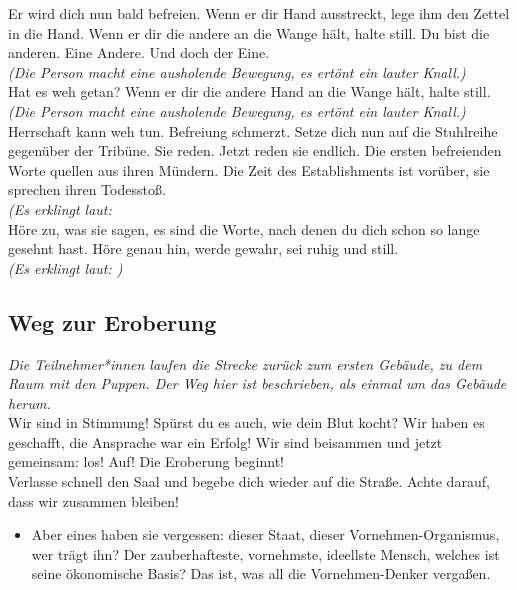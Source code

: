 \documentclass[a4paper, 12pt]{report}
\begin{document}
Er wird dich nun bald befreien. 
Wenn er dir Hand ausstreckt, lege ihm den Zettel in die Hand. 
Wenn er dir die andere an die Wange hält, halte still.
Du bist die anderen. Eine Andere. Und doch der Eine.\\
\emph{(Die Person macht eine ausholende Bewegung, es ertönt ein lauter Knall.)}\\
Hat es weh getan? 
Wenn er dir die andere Hand an die Wange hält, halte still.\\
\emph{(Die Person macht eine ausholende Bewegung, es ertönt ein lauter Knall.)}\\
Herrschaft kann weh tun. 
Befreiung schmerzt.
Setze dich nun auf die Stuhlreihe gegenüber der Tribüne. 
Sie reden.
Jetzt reden sie endlich.
Die ersten befreienden Worte quellen aus ihren Mündern. 
Die Zeit des Establishments ist vorüber, sie sprechen ihren Todesstoß.\\
\emph{(Es erklingt laut: }\\
Höre zu, was sie sagen, es sind die Worte, nach denen du dich schon so lange gesehnt hast. 
Höre genau hin, werde gewahr, sei ruhig und still.\\
\emph{(Es erklingt laut: )}\\



\subsection{Weg zur Eroberung}
\textit{Die Teilnehmer*innen laufen die Strecke zurück zum ersten Gebäude, zu dem Raum mit den Puppen. Der Weg hier ist beschrieben, als einmal um das Gebäude herum.}\\

Wir sind in Stimmung! 
Spürst du es auch, wie dein Blut kocht?
Wir haben es geschafft, die Ansprache war ein Erfolg! 
Wir sind beisammen und jetzt gemeinsam: los! Auf! Die Eroberung beginnt!\\
Verlasse schnell den Saal und begebe dich wieder auf die Straße. 
Achte darauf, dass wir zusammen bleiben!

\begin{itemize}\em
\item[] Aber eines haben sie vergessen:
    dieser Staat, dieser Vornehmen-Organismus, wer trägt ihn? 
    Der zauberhafteste, vornehmste, ideellste Mensch, welches ist seine ökonomische Basis?
    Das ist, was all die Vornehmen-Denker vergaßen. 
\end{itemize}
\end{document}
